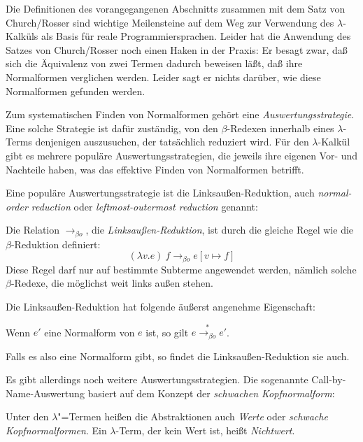 Die Definitionen des vorangegangenen Abschnitts zusammen mit dem Satz
von Church/\linebreak[0]Rosser sind wichtige Meilensteine auf dem Weg zur
Verwendung des $\lambda$-Kalküls als Basis für reale
Programmiersprachen.  Leider hat die Anwendung des Satzes von
Church/Rosser noch einen Haken in der Praxis: Er besagt zwar, daß sich
die Äquivalenz von zwei Termen dadurch beweisen läßt, daß ihre
Normalformen verglichen werden.  Leider sagt er nichts darüber,
wie diese Normalformen gefunden werden.

Zum systematischen Finden von Normalformen gehört
eine \textit{Auswertungsstrategie}.  Eine
solche Strategie ist dafür zuständig, von den $\beta$-Redexen
innerhalb eines $\lambda$-Terms denjenigen auszusuchen, der
tatsächlich reduziert wird.  Für den $\lambda$-Kalkül gibt es mehrere
populäre Auswertungsstrategien, die jeweils ihre eigenen Vor- und
Nachteile haben, was das effektive Finden von Normalformen betrifft.

Eine populäre Auswertungsstrategie ist die Linksaußen-Reduktion, auch
\textit{normal-order reduction} oder
\textit{leftmost-outermost reduction} genannt:
%
\begin{definition}
  Die Relation $\rightarrow_{\beta o}$, die
  \textit{Linksaußen-Reduktion}, ist durch die gleiche Regel wie
  die $\beta$-Reduktion definiert:
  \begin{displaymath}
    (\lambda v.e)~f \rightarrow_{\beta o} e[v\mapsto f]
  \end{displaymath}
  Diese Regel darf nur auf bestimmte Subterme angewendet werden,
  nämlich solche $\beta$-Redexe, die möglichst weit
  links außen stehen.
\end{definition}
%
Die Linksaußen-Reduktion hat folgende äußerst angenehme Eigenschaft:
%
\begin{satz}
  Wenn $e'$ eine Normalform von $e$ ist, so gilt
  $e\overset{\ast}{\rightarrow_{\beta o}} e'$.
\end{satz}
%
Falls es also eine Normalform gibt, so findet die Linksaußen-Reduktion
sie auch.

Es gibt allerdings noch weitere Auswertungsstrategien.  Die sogenannte
Call-by-Name-Auswertung basiert auf dem Konzept der \textit{schwachen
  Kopfnormalform}:

\begin{definition}\label{def:wert}
  Unter den $\lambda$"=Termen heißen die Abstraktionen auch
  \textit{Werte} oder \textit{schwache Kopfnormalformen}.  Ein
  $\lambda$-Term, der kein Wert ist, heißt \textit{Nichtwert}.  %
\end{definition}

